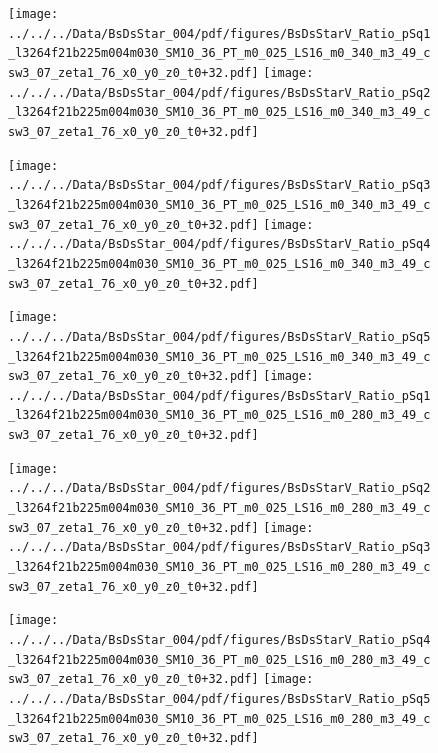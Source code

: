 \documentclass[a4paper,10pt]{article}
\begin{document}
\begin{figure}[p]
 \texttt{[image: ../../../Data/BsDsStar\_004/pdf/figures/BsDsStarV\_Ratio\_pSq1\_l3264f21b225m004m030\_SM10\_36\_PT\_m0\_025\_LS16\_m0\_340\_m3\_49\_csw3\_07\_zeta1\_76\_x0\_y0\_z0\_t0+32.pdf]} 
 \texttt{[image: ../../../Data/BsDsStar\_004/pdf/figures/BsDsStarV\_Ratio\_pSq2\_l3264f21b225m004m030\_SM10\_36\_PT\_m0\_025\_LS16\_m0\_340\_m3\_49\_csw3\_07\_zeta1\_76\_x0\_y0\_z0\_t0+32.pdf]} 
 \end{figure}
\begin{figure}[p]
 \texttt{[image: ../../../Data/BsDsStar\_004/pdf/figures/BsDsStarV\_Ratio\_pSq3\_l3264f21b225m004m030\_SM10\_36\_PT\_m0\_025\_LS16\_m0\_340\_m3\_49\_csw3\_07\_zeta1\_76\_x0\_y0\_z0\_t0+32.pdf]} 
 \texttt{[image: ../../../Data/BsDsStar\_004/pdf/figures/BsDsStarV\_Ratio\_pSq4\_l3264f21b225m004m030\_SM10\_36\_PT\_m0\_025\_LS16\_m0\_340\_m3\_49\_csw3\_07\_zeta1\_76\_x0\_y0\_z0\_t0+32.pdf]} 
 \end{figure}
\begin{figure}[p]
 \texttt{[image: ../../../Data/BsDsStar\_004/pdf/figures/BsDsStarV\_Ratio\_pSq5\_l3264f21b225m004m030\_SM10\_36\_PT\_m0\_025\_LS16\_m0\_340\_m3\_49\_csw3\_07\_zeta1\_76\_x0\_y0\_z0\_t0+32.pdf]} 
 \texttt{[image: ../../../Data/BsDsStar\_004/pdf/figures/BsDsStarV\_Ratio\_pSq1\_l3264f21b225m004m030\_SM10\_36\_PT\_m0\_025\_LS16\_m0\_280\_m3\_49\_csw3\_07\_zeta1\_76\_x0\_y0\_z0\_t0+32.pdf]} 
 \end{figure}
\clearpage
\begin{figure}[p]
 \texttt{[image: ../../../Data/BsDsStar\_004/pdf/figures/BsDsStarV\_Ratio\_pSq2\_l3264f21b225m004m030\_SM10\_36\_PT\_m0\_025\_LS16\_m0\_280\_m3\_49\_csw3\_07\_zeta1\_76\_x0\_y0\_z0\_t0+32.pdf]} 
 \texttt{[image: ../../../Data/BsDsStar\_004/pdf/figures/BsDsStarV\_Ratio\_pSq3\_l3264f21b225m004m030\_SM10\_36\_PT\_m0\_025\_LS16\_m0\_280\_m3\_49\_csw3\_07\_zeta1\_76\_x0\_y0\_z0\_t0+32.pdf]} 
 \end{figure}
\begin{figure}[p]
 \texttt{[image: ../../../Data/BsDsStar\_004/pdf/figures/BsDsStarV\_Ratio\_pSq4\_l3264f21b225m004m030\_SM10\_36\_PT\_m0\_025\_LS16\_m0\_280\_m3\_49\_csw3\_07\_zeta1\_76\_x0\_y0\_z0\_t0+32.pdf]} 
 \texttt{[image: ../../../Data/BsDsStar\_004/pdf/figures/BsDsStarV\_Ratio\_pSq5\_l3264f21b225m004m030\_SM10\_36\_PT\_m0\_025\_LS16\_m0\_280\_m3\_49\_csw3\_07\_zeta1\_76\_x0\_y0\_z0\_t0+32.pdf]} 
 \end{figure}
\clearpage
\end{document}
